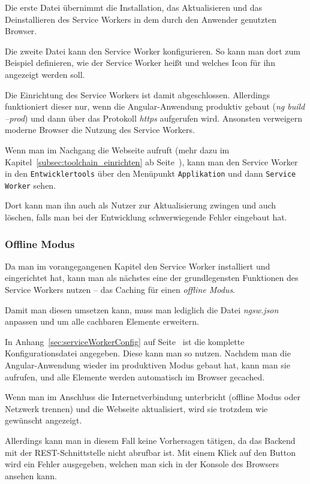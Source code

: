 Die erste Datei übernimmt die Installation, das Aktualisieren und das Deinstallieren des Service Workers in dem
durch den Anwender genutzten Browser.

Die zweite Datei kann den Service Worker konfigurieren. So kann man dort zum Beispiel definieren, wie der Service Worker
heißt und welches Icon für ihn angezeigt werden soll.

Die Einrichtung des Service Workers ist damit abgeschlossen. Allerdings funktioniert dieser nur, wenn die
Angular-Anwendung produktiv gebaut (\textit{ng build --prod}) und dann über das Protokoll \textit{https} aufgerufen
wird. Ansonsten verweigern moderne Browser die Nutzung des Service Workers.

Wenn man im Nachgang die Webseite aufruft (mehr dazu im Kapitel~\ref{subsec:toolchain_einrichten} ab
Seite~\pageref{subsec:toolchain_einrichten}), kann man den Service Worker in den \texttt{Entwicklertools} über den
Menüpunkt \texttt{Applikation} und dann \texttt{Service Worker} sehen.

Dort kann man ihn auch als Nutzer zur Aktualisierung zwingen und auch löschen, falls man bei der Entwicklung
schwerwiegende Fehler eingebaut hat.

\subsubsection{Offline Modus}
Da man im vorangegangenen Kapitel den Service Worker installiert und eingerichtet hat, kann man als nächstes eine der
grundlegensten Funktionen des Service Workers nutzen -- das Caching für einen \textit{offline Modus}.

Damit man diesen umsetzen kann, muss man lediglich die Datei \textit{ngsw.json} anpassen und um alle cachbaren Elemente
erweitern.

In Anhang~\ref{sec:serviceWorkerConfig} auf Seite~\pageref{sec:serviceWorkerConfig} ist die komplette
Konfigurationsdatei angegeben. Diese kann man so nutzen. Nachdem man die Angular-Anwendung wieder im produktiven Modus
gebaut hat, kann man sie aufrufen, und alle Elemente werden automatisch im Browser gecached.

Wenn man im Anschluss die Internetverbindung unterbricht (offline Modus oder Netzwerk trennen) und die Webseite
aktualisiert, wird sie trotzdem wie gewünscht angezeigt.

Allerdings kann man in diesem Fall keine Vorhersagen tätigen, da das Backend mit der REST-Schnittstelle nicht abrufbar
ist. Mit einem Klick auf den Button wird ein Fehler ausgegeben, welchen man sich in der Konsole des Browsers ansehen
kann.

